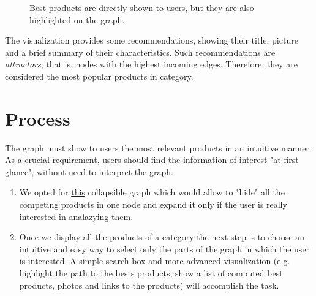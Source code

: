 \documentclass[a4paper,12pt]{article}
\begin{document}
\begin{enumerate}
\begin{figure}[H]
	\caption{Best products are directly shown to users, but they are also highlighted on the graph.}
	\label{fig:best}
	\end{figure}
	The visualization provides some recommendations, showing their title, picture and a brief summary of their characteristics. Such recommendations are \textit{attractors}, that is, nodes with the highest incoming edges. Therefore, they are considered the most popular products in category.
\end{enumerate}
\section{Process}
The graph must show to users the most relevant products in an intuitive manner. As a crucial requirement, users should find the information of interest "at first glance", without need to interpret the graph.
\begin{enumerate}
	\item We opted for \href{http://bl.ocks.org/GerHobbelt/3071239}{this} collapsible graph which would allow to "hide" all the competing products in one node and expand it only if the user is really interested in analazying them. 
	\item Once we display all the products of a category the next step is to choose an intuitive and easy way to select only the parts of the graph in which the user is interested. A simple search box and more advanced visualization (e.g. highlight the path to the bests products, show a list of computed best products, photos and links to the products) will accomplish the task.
\end{enumerate}
 
\end{document}
